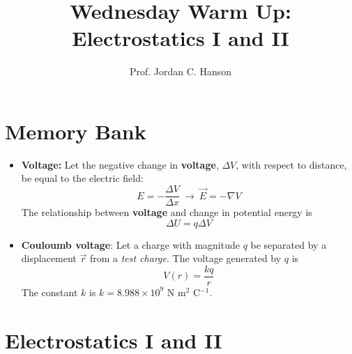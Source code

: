 \documentclass{article}
\begin{document}
\twocolumn

\title{Wednesday Warm Up: Electrostatics I and II}
\author{Prof. Jordan C. Hanson}

\maketitle

\section{Memory Bank}

\begin{itemize}
\item \textbf{Voltage:} Let the negative change in \textbf{voltage}, $\Delta V$, with respect to distance, be equal to the electric field:
\begin{equation}
E = - \frac{\Delta V}{\Delta x} ~\rightarrow~ \vec{E} = -\nabla V
\end{equation}
The relationship between \textbf{voltage} and change in potential energy is
\begin{equation}
\Delta U = q \Delta V
\end{equation}
\item \textbf{Couloumb voltage}: Let a charge with magnitude $q$ be separated by a displacement $\vec{r}$ from a \textit{test charge}.  The voltage generated by $q$ is 
\begin{equation}
V(r) = \frac{k q}{r}
\end{equation}
The constant $k$ is $k=8.988 \times 10^9$ N m$^2$ C$^{-1}$.
\end{itemize}

\section{Electrostatics I and II}
\end{document}
